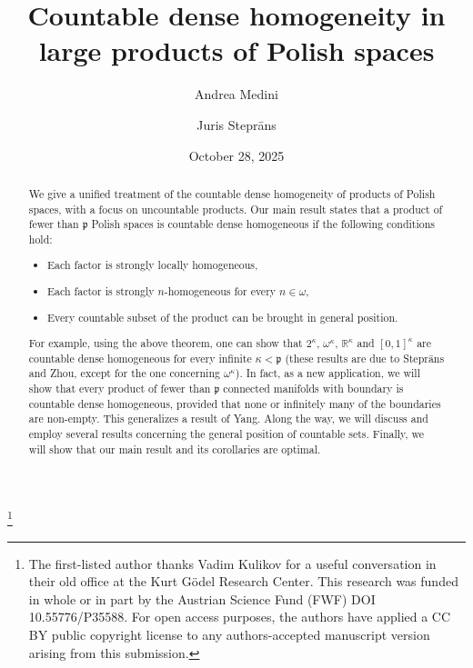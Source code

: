\documentclass{amsart}
\theoremstyle{plain}
\theoremstyle{definition}
\newcommand{\RRR}{\mathbb{R}}
\newcommand{\pppp}{\mathfrak{p}}
\begin{document}
\title{Countable dense homogeneity in large products of Polish spaces}

\author{Andrea Medini}
\address{Institut f\"{u}r Diskrete Mathematik und Geometrie
\newline\indent Technische Universit\"{a}t Wien
\newline\indent Wiedner Hauptstra\ss e 8-10/104
\newline{} Vienna, Austria}

\author{Juris Stepr\={a}ns}
\address{Department of Mathematics
\newline\indent York University
\newline{}, Keele Street
\newline\indent Toronto, Ontario M3J 1P3, Canada}

\date{October 28, 2025}

\thanks{The first-listed author thanks Vadim Kulikov for a useful conversation in their old office at the Kurt G\"{o}del Research Center. This research was funded in whole or in part by the Austrian Science Fund (FWF) DOI 10.55776/P35588. For open access purposes, the authors have applied a CC BY public copyright license to any authors-accepted manuscript version arising from this submission.}

\begin{abstract}
We give a unified treatment of the countable dense homogeneity of products of Polish spaces, with a focus on uncountable products. Our main result states that a product of fewer than $\pppp$ Polish spaces is countable dense homogeneous if the following conditions hold:
\begin{itemize}
\item Each factor is strongly locally homogeneous,
\item Each factor is strongly $n$-homogeneous for every $n\in\omega$,
\item Every countable subset of the product can be brought in general position.
\end{itemize}
For example, using the above theorem, one can show that $2^\kappa$, $\omega^\kappa$, $\RRR^\kappa$ and $[0,1]^\kappa$ are countable dense homogeneous for every infinite $\kappa <\pppp$ (these results are due to Stepr\={a}ns and Zhou, except for the one concerning $\omega^\kappa$). In fact, as a new application, we will show that every product of fewer than $\pppp$ connected manifolds with boundary is countable dense homogeneous, provided that none or infinitely many of the boundaries are non-empty. This generalizes a result of Yang. Along the way, we will discuss and employ several results concerning the general position of countable sets. Finally, we will show that our main result and its corollaries are optimal.
\end{abstract}
\end{document}
